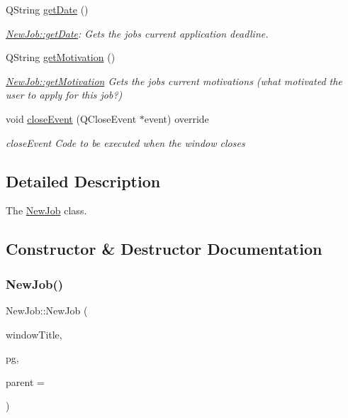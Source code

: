 \begin{DoxyCompactItemize}
Q\+String \hyperlink{class_new_job_abe92b6bce4e8e3485f59554a2cbad1bc}{get\+Date} ()
\begin{DoxyCompactList}\small\item\em \hyperlink{class_new_job_abe92b6bce4e8e3485f59554a2cbad1bc}{New\+Job\+::get\+Date}\+: Gets the job\textquotesingle{}s current application deadline. \end{DoxyCompactList}\item 
Q\+String \hyperlink{class_new_job_a665113a114684439ed3705c8c5f8eabf}{get\+Motivation} ()
\begin{DoxyCompactList}\small\item\em \hyperlink{class_new_job_a665113a114684439ed3705c8c5f8eabf}{New\+Job\+::get\+Motivation} Gets the job\textquotesingle{}s current motivations (what motivated the user to apply for this job?) \end{DoxyCompactList}\item 
void \hyperlink{class_new_job_a84f6390f63ce01fb860b375f53f9c68d}{close\+Event} (Q\+Close\+Event $\ast$event) override
\begin{DoxyCompactList}\small\item\em close\+Event Code to be executed when the window closes \end{DoxyCompactList}\end{DoxyCompactItemize}


\subsection{Detailed Description}
The \hyperlink{class_new_job}{New\+Job} class. 

\subsection{Constructor \& Destructor Documentation}
\mbox{\label{class_new_job_a489279a9ec91bcac74d7dad65eb2f85a}} 
\subsubsection{\texorpdfstring{New\+Job()}{NewJob()}}
{\footnotesize\ttfamily New\+Job\+::\+New\+Job (\begin{DoxyParamCaption}\item[{Q\+String}]{window\+Title,  }\item[{\hyperlink{classpsql}{psql} $\ast$}]{pg,  }\item[{Q\+Widget $\ast$}]{parent = {} }\end{DoxyParamCaption})\hspace{0.3cm}{\ttfamily [explicit]}}



